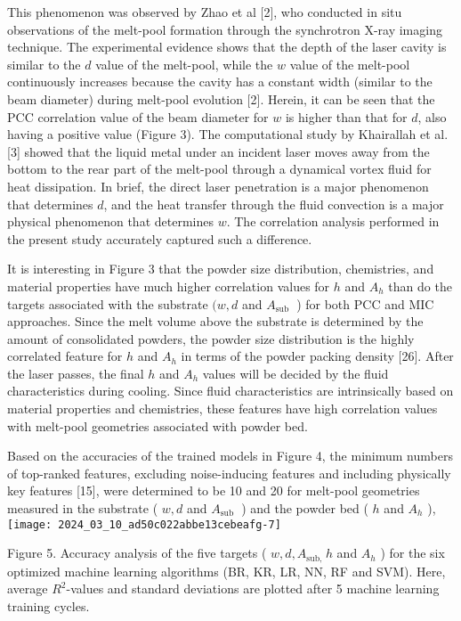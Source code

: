 \documentclass[10pt]{article}
\begin{document}
This phenomenon was observed by Zhao et al [2], who conducted in situ observations of the melt-pool formation through the synchrotron X-ray imaging technique. The experimental evidence shows that the depth of the laser cavity is similar to the $d$ value of the melt-pool, while the $w$ value of the melt-pool continuously increases because the cavity has a constant width (similar to the beam diameter) during melt-pool evolution [2]. Herein, it can be seen that the PCC correlation value of the beam diameter for $w$ is higher than that for $d$, also having a positive value (Figure 3). The computational study by Khairallah et al. [3] showed that the liquid metal under an incident laser moves away from the bottom to the rear part of the melt-pool through a dynamical vortex fluid for heat dissipation. In brief, the direct laser penetration is a major phenomenon that determines $d$, and the heat transfer through the fluid convection is a major physical phenomenon that determines $w$. The correlation analysis performed in the present study accurately captured such a difference.

It is interesting in Figure 3 that the powder size distribution, chemistries, and material properties have much higher correlation values for $h$ and $A_{h}$ than do the targets associated with the substrate $(w, d$ and $A_{\text {sub }}$ ) for both PCC and MIC approaches. Since the melt volume above the substrate is determined by the amount of consolidated powders, the powder size distribution is the highly correlated feature for $h$ and $A_{h}$ in terms of the powder packing density [26]. After the laser passes, the final $h$ and $A_{h}$ values will be decided by the fluid characteristics during cooling. Since fluid characteristics are intrinsically based on material properties and chemistries, these features have high correlation values with melt-pool geometries associated with powder bed.

Based on the accuracies of the trained models in Figure 4, the minimum numbers of top-ranked features, excluding noise-inducing features and including physically key features [15], were determined to be 10 and 20 for melt-pool geometries measured in the substrate ( $w, d$ and $A_{\text {sub }}$ ) and the powder bed ( $h$ and $A_{h}$ ),\\
\texttt{[image: 2024\_03\_10\_ad50c022abbe13cebeafg-7]}

Figure 5. Accuracy analysis of the five targets ( $w, d, A_{\text {sub, }} h$ and $A_{h}$ ) for the six optimized machine learning algorithms (BR, KR, LR, NN, RF and SVM). Here, average $R^{2}$-values and standard deviations are plotted after 5 machine learning training cycles.
\end{document}
